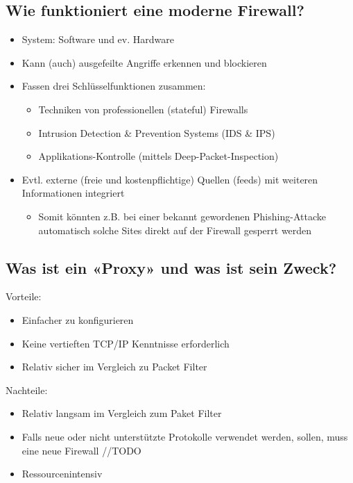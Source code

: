 \subsection*{Wie funktioniert eine moderne Firewall?}
\begin{itemize}
    \item System: Software und ev. Hardware
    \item Kann (auch) ausgefeilte Angriffe erkennen und blockieren
    \item Fassen drei Schlüsselfunktionen zusammen:
    \begin{itemize}
        \item Techniken von professionellen (stateful) Firewalls
        \item Intrusion Detection \& Prevention Systems (IDS \& IPS)
        \item Applikations-Kontrolle (mittels Deep-Packet-Inspection)
    \end{itemize}
    \item Evtl. externe (freie und kostenpflichtige) Quellen (feeds) mit weiteren Informationen integriert
    \begin{itemize}
        \item Somit könnten z.B. bei einer bekannt gewordenen Phishing-Attacke automatisch solche Sites direkt auf der Firewall gesperrt werden
    \end{itemize}
\end{itemize}

\subsection*{Was ist ein «Proxy» und was ist sein Zweck?}
Vorteile:
\begin{itemize}
    \item Einfacher zu konfigurieren
    \item Keine vertieften TCP/IP Kenntnisse erforderlich
    \item Relativ sicher im Vergleich zu Packet Filter
\end{itemize}
Nachteile:
\begin{itemize}
    \item Relativ langsam im Vergleich zum Paket Filter
    \item Falls neue oder nicht unterstützte Protokolle verwendet werden, sollen, muss eine neue Firewall //TODO
    \item Ressourcenintensiv
\end{itemize}

